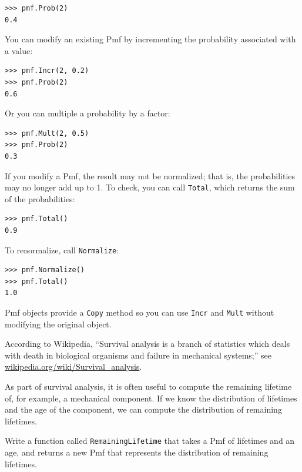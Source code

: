 \documentclass[12pt]{book}
\begin{document}
\begin{verbatim}
>>> pmf.Prob(2)
0.4
\end{verbatim}

You can modify an existing Pmf by incrementing the probability
associated with a value:

\begin{verbatim}
>>> pmf.Incr(2, 0.2)
>>> pmf.Prob(2)
0.6
\end{verbatim}

Or you can multiple a probability by a factor:

\begin{verbatim}
>>> pmf.Mult(2, 0.5)
>>> pmf.Prob(2)
0.3
\end{verbatim}

If you modify a Pmf, the result may not be
normalized; that is, the probabilities may no longer add up to 1.
To check, you can call {\tt Total}, which returns the sum of the
probabilities:

\begin{verbatim}
>>> pmf.Total()
0.9
\end{verbatim}

To renormalize, call {\tt Normalize}:

\begin{verbatim}
>>> pmf.Normalize()
>>> pmf.Total()
1.0
\end{verbatim}

Pmf objects provide a {\tt Copy} method so you can
use {\tt Incr} and {\tt Mult} without modifying the original object.

\begin{ex}

According to Wikipedia, ``Survival analysis is a branch of statistics
which deals with death in biological organisms and failure in
mechanical systems;'' see \url{wikipedia.org/wiki/Survival_analysis}.

As part of survival analysis, it is often useful to compute the
remaining lifetime of, for example, a mechanical component.  If we
know the distribution of lifetimes and the age of the component,
we can compute the distribution of remaining lifetimes.

Write a function called {\tt RemainingLifetime} that takes a
Pmf of lifetimes and an age, and returns a new Pmf that represents
the distribution of remaining lifetimes.

\end{ex}
\end{document}
